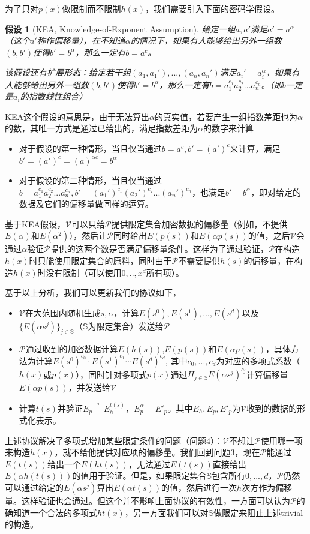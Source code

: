 \documentclass[12pt]{article}
\newcommand{\pp}{$\mathcal{P}$}
\newcommand{\vv}{$\mathcal{V}$}
\newtheorem{assumption}{假设}
\begin{document}
为了只对$p(x)$做限制而不限制$h(x)$，我们需要引入下面的密码学假设。
\begin{assumption}[KEA, Knowledge-of-Exponent Assumption]
	给定一组$a,a'$满足$a'= a^\alpha$（这个$a'$称作偏移量），在不知道$\alpha$的情况下，如果有人能够给出另外一组数$(b,b')$使得$b'= b^\alpha$，那么一定有$b=a^c$。
	
	该假设还有扩展形态：给定若干组$(a_1,a_1'),...,(a_n,a_n')$满足$a_i'=a_i^\alpha$，如果有人能够给出另外一组数$(b,b')$使得$b'= b^\alpha$，那么一定有$b=a_1^{c_1}a_2^{c_2}...a_n^{c_n}$。（即$b$一定是$a_i$的指数线性组合）
\end{assumption}
KEA这个假设的意思是，由于无法算出$\alpha$的真实值，若要产生一组指数差距也为$\alpha$的数，其唯一方式是通过已给出的，满足指数差距为$\alpha$的数字来计算
\begin{itemize}
	\item 对于假设的第一种情形，当且仅当通过$b=a^c,b'=(a')^c$来计算，满足$b'= (a')^c=(a)^{\alpha c} = b^\alpha$
	\item 对于假设的第二种情形，当且仅当通过$b=a_1^{c_1}a_2^{c_2}...a_n^{c_n},b'=(a_1')^{c_1}(a_2')^{c_2}...(a_n')^{c_n}$，也满足$b'=b^\alpha$，即对给定的数据及它们的偏移量做同样的运算。
\end{itemize}
基于KEA假设，\vv 可以只给\pp 提供限定集合加密数据的偏移量（例如，不提供$E(\alpha)$和$E(\alpha ^2)$），然后让\pp 同时给出$E(p(s))$和$E(\alpha p(s))$的值，之后\vv 会通过$\alpha$验证\pp 提供的这两个数是否满足偏移量条件。这样为了通过验证，\pp 在构造$h(x)$时只能使用限定集合的原料，同时由于\pp 不需要提供$h(s)$的偏移量，在构造$h(x)$时没有限制（可以使用$0,..,x^d$所有项）。

基于以上分析，我们可以更新我们的协议如下，
\begin{itemize}
	\item \vv 在大范围内随机生成$s,\alpha$，计算$E(s^0),E(s^1),...,E(s^d)$以及$\{E(\alpha s^j)\}_{j\in \mathbb{S}}$（$\mathbb{S}$为限定集合）发送给\pp
	\item \pp 通过收到的加密数据计算$E(h(s))$,$E(p(s))$和$E(\alpha p(s))$，具体方法为计算$E(s^0)^{c_0}\cdot E(s^1)^{c_1}\cdots E(s^d)^{c_d}$, 其中$c_0,...,c_d$为对应的多项式系数（$h(x)$或$p(x)$），同时针对多项式$p(x)$通过$\Pi_{j \in \mathbb{S}} E(\alpha s^j)^{c_j}$计算偏移量$E(\alpha p(s))$，并发送给\vv
	\item 计算$t(s)$并验证$E_p \overset{?}{=}E_h^{t(s)}$，$E_p^\alpha = E'_p$。其中$E_h,E_p,E'_p$为\vv 收到的数据的形式化表示。
\end{itemize}
上述协议解决了多项式增加某些限定条件的问题（问题4）：\vv 不想让\pp 使用哪一项来构造$h(x)$，就不给他提供对应项的偏移量。我们回到问题3，现在\pp 能通过$E(t(s))$给出一个$E(ht(s))$，无法通过$E(t(s))$直接给出$E(\alpha h(t(s)))$的值用于验证。但是，如果限定集合$\mathbb{S}$包含所有$0,...,d$，\pp 仍然可以通过给定的$E(\alpha s^j)$算出$E(\alpha t(s))$的值，然后进行一次$h$次方作为偏移量。这样验证也会通过。但这个并不影响上面协议的有效性，一方面可以认为\pp 的确知道一个合法的多项式$ht(x)$，另一方面我们可以对$\mathbb{S}$做限定来阻止上述trivial的构造。
\end{document}
